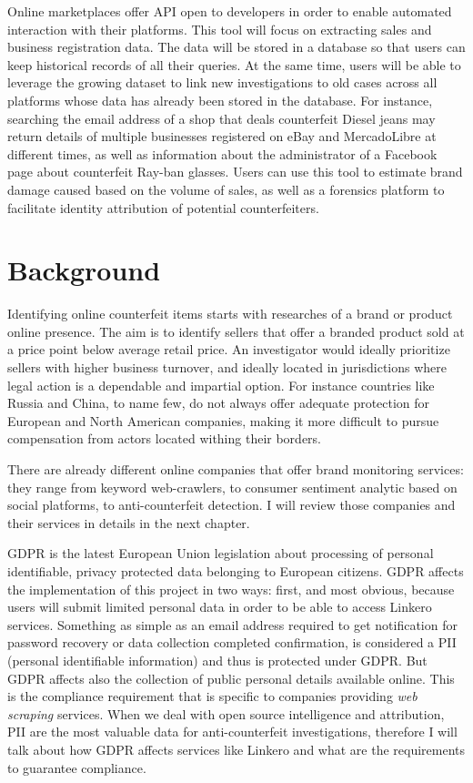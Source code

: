Online marketplaces offer API open to developers in order to enable automated
interaction with their platforms. This tool will focus on extracting sales and
business registration data. The data will be stored in a database so that users
can keep historical records of all their queries. At the same time, users will
be able to leverage the growing dataset to link new investigations to old cases
across all platforms whose data has already been stored in the database. For
instance, searching the email address of a shop that deals counterfeit Diesel
jeans may return details of multiple businesses registered on eBay and
MercadoLibre at different times, as well as information about the administrator
of a Facebook page about counterfeit Ray-ban glasses. Users can use this tool to
estimate brand damage caused based on the volume of sales, as well as a
forensics platform to facilitate identity attribution of potential
counterfeiters.

\section{Background}
Identifying online counterfeit items starts with researches of a brand or
product online presence. The aim is to identify sellers that offer a branded
product sold at a price point below average retail price. An investigator would
ideally prioritize sellers with higher business turnover, and ideally located in
jurisdictions where legal action is a dependable and impartial option. For
instance countries like Russia and China, to name few, do not always offer
adequate protection for European and North American companies, making it more difficult to pursue
compensation from actors located withing their borders.

There are already different online companies that offer brand monitoring
services: they range from keyword web-crawlers, to consumer sentiment analytic
based on social platforms, to anti-counterfeit detection. I will review those
companies and their services in details in the next chapter.

GDPR is the latest European Union legislation about processing of personal
identifiable, privacy protected data belonging to European citizens. GDPR
affects the implementation of this project in two ways: first, and most obvious,
because users will submit limited personal data in order to be able to access
Linkero services. Something as simple as an email address required to get
notification for password recovery or data collection completed confirmation, is
considered a PII (personal identifiable information) and thus is protected under
GDPR. But GDPR affects also the collection of public personal details available
online. This is the compliance requirement that is specific to companies
providing \emph{web scraping} services. When we deal with open source
intelligence and attribution, PII are the most valuable data for
anti-counterfeit investigations, therefore I will talk about how GDPR affects
services like Linkero and what are the requirements to guarantee compliance.


